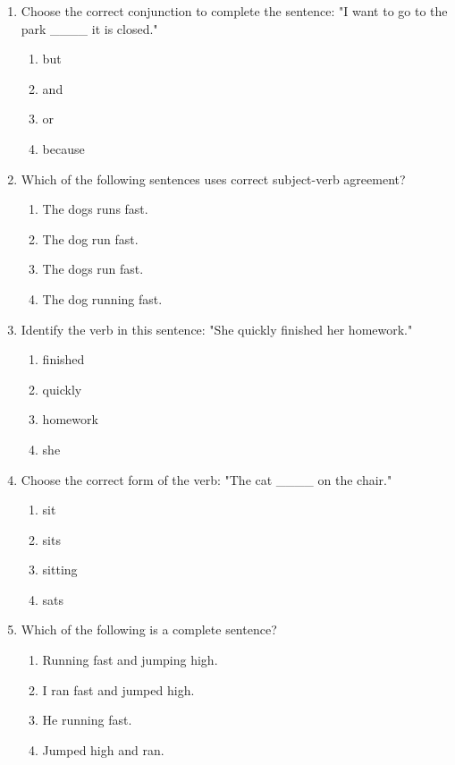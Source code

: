 \documentclass[12pt]{article}
\begin{document}
\begin{enumerate}
    \item Choose the correct conjunction to complete the sentence:  
    "I want to go to the park \_\_\_\_ it is closed."  
    \begin{enumerate}[label=\Alph*.]
        \item but
        \item and
        \item or
        \item because
    \end{enumerate}
    \vspace{0.5cm}

    \item Which of the following sentences uses correct subject-verb agreement?  
    \begin{enumerate}[label=\Alph*.]
        \item The dogs runs fast.
        \item The dog run fast.
        \item The dogs run fast.
        \item The dog running fast.
    \end{enumerate}
    \vspace{0.5cm}

    \item Identify the verb in this sentence: "She quickly finished her homework."  
    \begin{enumerate}[label=\Alph*.]
        \item finished
        \item quickly
        \item homework
        \item she
    \end{enumerate}
    \vspace{0.5cm}

    \item Choose the correct form of the verb:  
    "The cat \_\_\_\_ on the chair."  
    \begin{enumerate}[label=\Alph*.]
        \item sit
        \item sits
        \item sitting
        \item sats
    \end{enumerate}
    \vspace{0.5cm}

    \item Which of the following is a complete sentence?  
    \begin{enumerate}[label=\Alph*.]
        \item Running fast and jumping high.
        \item I ran fast and jumped high.
        \item He running fast.
        \item Jumped high and ran.
    \end{enumerate}
    \vspace{0.5cm}


\end{enumerate}
\end{document}
